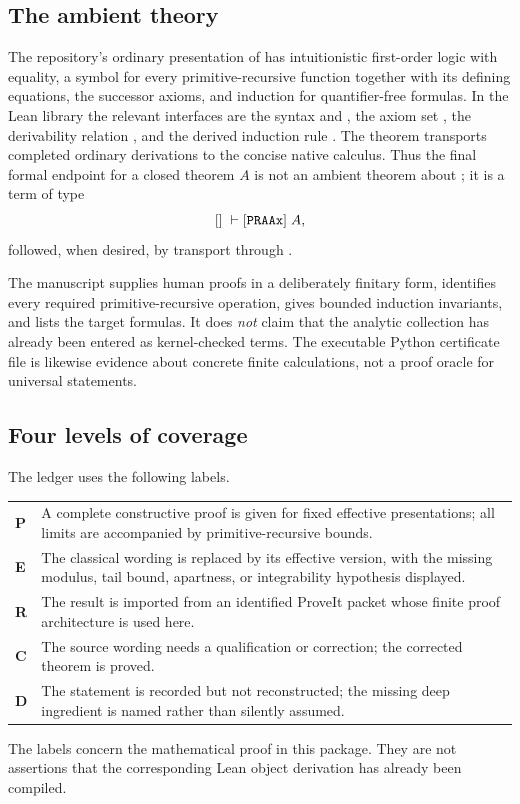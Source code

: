 \subsection{The ambient theory}

The repository's ordinary presentation of \ipra{} has intuitionistic first-order logic with equality, a symbol for every primitive-recursive function together with its defining equations, the successor axioms, and induction for quantifier-free formulas.  In the Lean library the relevant interfaces are the syntax  and , the axiom set , the derivability relation , and the derived induction rule .  The theorem  transports completed ordinary derivations to the concise native calculus.  Thus the final formal endpoint for a closed theorem $A$ is not an ambient theorem about ; it is a term of type
\[
  []\;\vdash[\code{PRAAx}]\; A,
\]
followed, when desired, by transport through .

The manuscript supplies human proofs in a deliberately finitary form, identifies every required primitive-recursive operation, gives bounded induction invariants, and lists the target formulas.  It does \emph{not} claim that the analytic collection has already been entered as kernel-checked  terms.  The executable Python certificate file is likewise evidence about concrete finite calculations, not a proof oracle for universal statements.

\subsection{Four levels of coverage}

The ledger uses the following labels.
\begin{center}
\begin{tabularx}{0.94\textwidth}{>{\bfseries}l X}
\toprule
P & A complete constructive proof is given for fixed effective presentations; all limits are accompanied by primitive-recursive bounds.\\
E & The classical wording is replaced by its effective version, with the missing modulus, tail bound, apartness, or integrability hypothesis displayed.\\
R & The result is imported from an identified ProveIt packet whose finite proof architecture is used here.\\
C & The source wording needs a qualification or correction; the corrected theorem is proved.\\
D & The statement is recorded but not reconstructed; the missing deep ingredient is named rather than silently assumed.\\
\bottomrule
\end{tabularx}
\end{center}
The labels concern the mathematical proof in this package.  They are not assertions that the corresponding Lean object derivation has already been compiled.

